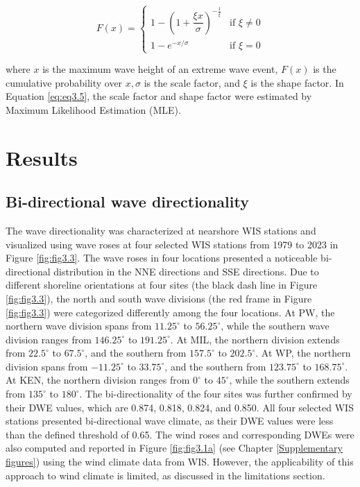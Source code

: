 \begin{equation}
    F(x) =
\begin{cases}
1 - \left(1 + \dfrac{\xi x}{\sigma} \right)^{-\frac{1}{\xi}} & \text{if } \xi \ne 0 \\
1 - e^{-x/\sigma} & \text{if } \xi = 0
\end{cases}
\label{eq:eq3.5}
\end{equation}

where $x$ is the maximum wave height of an extreme wave event, $F(x)$ is the cumulative probability over $x, \sigma$ is the scale factor, and $\xi$ is the shape factor. In Equation \ref{eq:eq3.5}, the scale factor and shape factor were estimated by Maximum Likelihood Estimation (MLE). 

\section{Results}
\label{c3_Results}

\subsection{Bi-directional wave directionality}
\label{c3_Bi-directional wave directionality}

The wave directionality was characterized at nearshore WIS stations and visualized using wave roses at four selected WIS stations from 1979 to 2023 in Figure \ref{fig:fig3.3}. The wave roses in four locations presented a noticeable bi-directional distribution in the NNE directions and SSE directions. Due to different shoreline orientations at four sites (the black dash line in Figure \ref{fig:fig3.3}), the north and south wave divisions (the red frame in Figure \ref{fig:fig3.3}) were categorized differently among the four locations. At PW, the northern wave division spans from $11.25^\circ$ to $56.25^\circ$, while the southern wave division ranges from $146.25^\circ$ to $191.25^\circ$. At MIL, the northern division extends from $22.5^\circ$ to $67.5^\circ$, and the southern from $157.5^\circ$ to $202.5^\circ$. At WP, the northern division spans from $-11.25^\circ$ to $33.75^\circ$, and the southern from $123.75^\circ$ to $168.75^\circ$. At KEN, the northern division ranges from $0^\circ$ to $45^\circ$, while the southern extends from $135^\circ$ to $180^\circ$. The bi-directionality of the four sites was further confirmed by their DWE values, which are 0.874, 0.818, 0.824, and 0.850. All four selected WIS stations presented bi-directional wave climate, as their DWE values were less than the defined threshold of 0.65. The wind roses and corresponding DWEs were also computed and reported in Figure \ref{fig:fig3.1a} (see Chapter \ref{Supplementary figures}) using the wind climate data from WIS. However, the applicability of this approach to wind climate is limited, as discussed in the limitations section.

